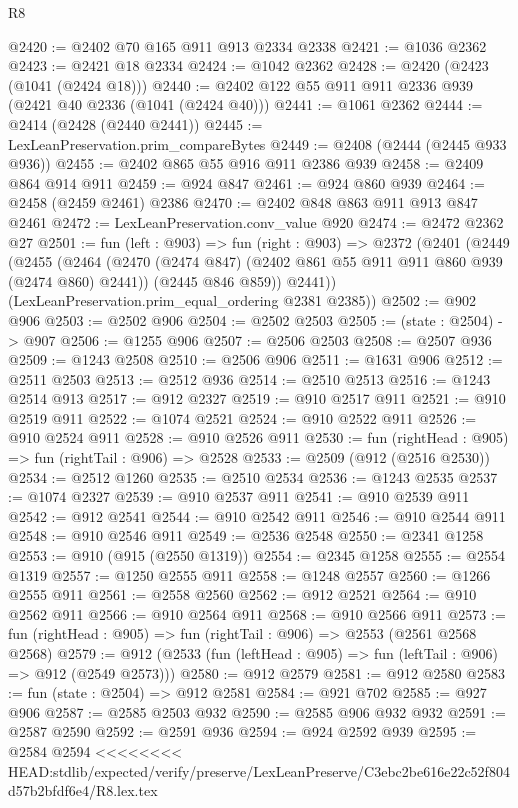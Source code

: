 \begin{lexlean}{R8}
\begin{coremodule}
{{{{{{{{{{{{{{{{{{{{{{{{{{{{{{{{{{{{{{{{{{{{{@2420 := @2402 @70 @165 @911 @913 @2334 @2338
@2421 := @1036 @2362
@2423 := @2421 @18 @2334
@2424 := @1042 @2362
@2428 := @2420 (@2423 (@1041 (@2424 @18)))
@2440 := @2402 @122 @55 @911 @911 @2336 @939 (@2421 @40 @2336 (@1041 (@2424 @40)))
@2441 := @1061 @2362
@2444 := @2414 (@2428 (@2440 @2441))
@2445 := LexLeanPreservation.prim_compareBytes
@2449 := @2408 (@2444 (@2445 @933 @936))
@2455 := @2402 @865 @55 @916 @911 @2386 @939
@2458 := @2409 @864 @914 @911
@2459 := @924 @847
@2461 := @924 @860 @939
@2464 := @2458 (@2459 @2461) @2386
@2470 := @2402 @848 @863 @911 @913 @847 @2461
@2472 := LexLeanPreservation.conv_value @920
@2474 := @2472 @2362 @27
@2501 := fun (left : @903) =>
  fun (right : @903) =>
  @2372
    (@2401
      (@2449
        (@2455
          (@2464
            (@2470 (@2474 @847) (@2402 @861 @55 @911 @911 @860 @939 (@2474 @860) @2441))
            (@2445 @846 @859))
          @2441))
      (LexLeanPreservation.prim_equal_ordering @2381 @2385))
@2502 := @902 @906
@2503 := @2502 @906
@2504 := @2502 @2503
@2505 := (state : @2504) -> @907
@2506 := @1255 @906
@2507 := @2506 @2503
@2508 := @2507 @936
@2509 := @1243 @2508
@2510 := @2506 @906
@2511 := @1631 @906
@2512 := @2511 @2503
@2513 := @2512 @936
@2514 := @2510 @2513
@2516 := @1243 @2514 @913
@2517 := @912 @2327
@2519 := @910 @2517 @911
@2521 := @910 @2519 @911
@2522 := @1074 @2521
@2524 := @910 @2522 @911
@2526 := @910 @2524 @911
@2528 := @910 @2526 @911
@2530 := fun (rightHead : @905) => fun (rightTail : @906) => @2528
@2533 := @2509 (@912 (@2516 @2530))
@2534 := @2512 @1260
@2535 := @2510 @2534
@2536 := @1243 @2535
@2537 := @1074 @2327
@2539 := @910 @2537 @911
@2541 := @910 @2539 @911
@2542 := @912 @2541
@2544 := @910 @2542 @911
@2546 := @910 @2544 @911
@2548 := @910 @2546 @911
@2549 := @2536 @2548
@2550 := @2341 @1258
@2553 := @910 (@915 (@2550 @1319))
@2554 := @2345 @1258
@2555 := @2554 @1319
@2557 := @1250 @2555 @911
@2558 := @1248 @2557
@2560 := @1266 @2555 @911
@2561 := @2558 @2560
@2562 := @912 @2521
@2564 := @910 @2562 @911
@2566 := @910 @2564 @911
@2568 := @910 @2566 @911
@2573 := fun (rightHead : @905) => fun (rightTail : @906) => @2553 (@2561 @2568 @2568)
@2579 := @912 (@2533 (fun (leftHead : @905) => fun (leftTail : @906) => @912 (@2549 @2573)))
@2580 := @912 @2579
@2581 := @912 @2580
@2583 := fun (state : @2504) => @912 @2581
@2584 := @921 @702
@2585 := @927 @906
@2587 := @2585 @2503 @932
@2590 := @2585 @906 @932 @932
@2591 := @2587 @2590
@2592 := @2591 @936
@2594 := @924 @2592 @939
@2595 := @2584 @2594
<<<<<<<< HEAD:stdlib/expected/verify/preserve/LexLeanPreserve/C3ebc2be616e22c52f804d57b2bfdf6e4/R8.lex.tex
}}}}}}}}}}}}}}}}}}}}}}}}}}}}}}}}}}}}}}}}}}}}}
\end{coremodule}
\end{lexlean}
